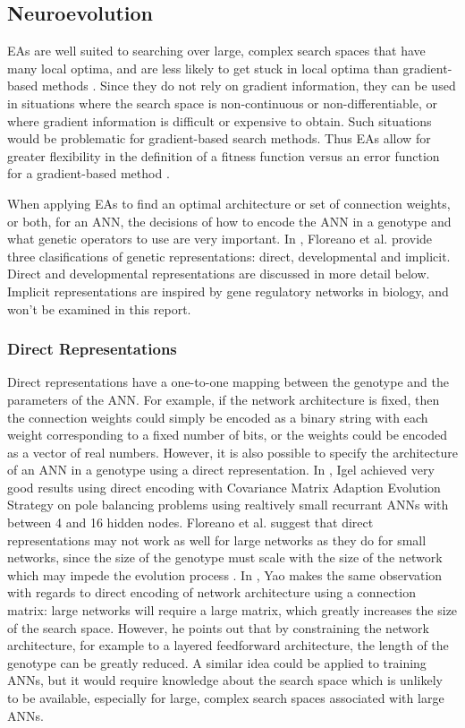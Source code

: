 \documentclass[12pt]{article} %
\begin{document}
\subsection{Neuroevolution}

EAs are well suited to searching over large, complex search spaces that have many local optima, and are less likely to get stuck in local optima than gradient-based methods \cite{Yao1999}. Since they do not rely on gradient information, they can be used in situations where the search space is non-continuous or non-differentiable, or where gradient information is difficult or expensive to obtain. Such situations would be problematic for gradient-based search methods. Thus EAs allow for greater flexibility in the definition of a fitness function versus an error function for a gradient-based method \cite{Floreano2008}\cite{Yao1999}.

When applying EAs to find an optimal architecture or set of connection weights, or both, for an ANN, the decisions of how to encode the ANN in a genotype and what genetic operators to use are very important. In \cite{Floreano2008}, Floreano et al. provide three clasifications of genetic representations: direct, developmental and implicit. Direct and developmental representations are discussed in more detail below. Implicit representations are inspired by gene regulatory networks in biology, and won't be examined in this report.

\subsubsection{Direct Representations}

Direct representations have a one-to-one mapping between the genotype and the parameters of the ANN. For example, if the network architecture is fixed, then the connection weights could simply be encoded as a binary string with each weight corresponding to a fixed number of bits, or the weights could be encoded as a vector of real numbers. However, it is also possible to specify the architecture of an ANN in a genotype using a direct representation. In \cite{Igel2003}, Igel achieved very good results using direct encoding with Covariance Matrix Adaption Evolution Strategy on pole balancing problems using realtively small recurrant ANNs with between 4 and 16 hidden nodes. Floreano et al. suggest that direct representations may not work as well for large networks as they do for small networks, since the size of the genotype must scale with the size of the network which may impede the evolution process \cite{Floreano2008}. In \cite{Yao1999}, Yao makes the same observation with regards to direct encoding of network architecture using a connection matrix: large networks will require a large matrix, which greatly increases the size of the search space. However, he points out that by constraining the network architecture, for example to a layered feedforward architecture, the length of the genotype can be greatly reduced. A similar idea could be applied to training ANNs, but it would require knowledge about the search space which is unlikely to be available, especially for large, complex search spaces associated with large ANNs.
\end{document}
